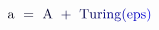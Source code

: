\documentclass[12pt]{article}
\begin{document}
\makeatletter
\renewcommand*{\@textcolor}[3]{%
  \protect\leavevmode
  \begingroup
    \color#1{#2}#3%
  \endgroup
}
\makeatother
\begin{displaymath}
\mathrm { \mathcolor[RGB]{0,0,15}{a} } \ \mathcolor[RGB]{0,0,30}{=} \ \mathrm { \mathcolor[RGB]{0,0,45}{A} } \ \mathcolor[RGB]{0,0,60}{+} \ \mathrm { \mathcolor[RGB]{0,0,75}{T} \mathcolor[RGB]{0,0,90}{u} \mathcolor[RGB]{0,0,105}{r} \mathcolor[RGB]{0,0,120}{i} \mathcolor[RGB]{0,0,135}{n} \mathcolor[RGB]{0,0,150}{g} } \mathcolor[RGB]{0,0,165}{(} \mathrm { \mathcolor[RGB]{0,0,180}{e} \mathcolor[RGB]{0,0,195}{p} \mathcolor[RGB]{0,0,210}{s} } \mathcolor[RGB]{0,0,225}{)}
\end{displaymath}
\end{document}
